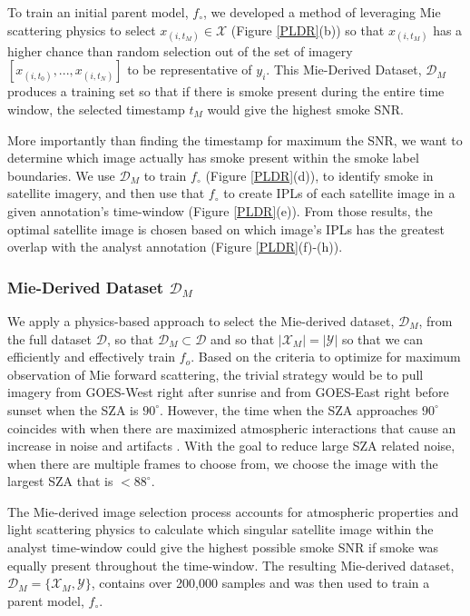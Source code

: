 \documentclass{article}
\begin{document}
To train an initial parent model, \(f_{\circ}\), we developed a method of leveraging Mie scattering physics to select \(x_{(i,t_M)} \in \mathcal{X}\) (Figure \ref{PLDR}(b)) so that \(x_{(i,t_M)}\) has a higher chance than random selection out of the set of imagery \([x_{(i,t_0)},...,x_{(i,t_N)}]\) to be representative of \(y_i\). This Mie-Derived Dataset, \(\mathcal{D}_M\) produces a training set so that if there is smoke present during the entire time window, the selected timestamp \(t_M\) would give the highest smoke SNR. 

More importantly than finding the timestamp for maximum the SNR, we want to determine which image actually has smoke present within the smoke label boundaries. We use \(\mathcal{D}_M\) to train \(f_{\circ}\) (Figure \ref{PLDR}(d)), to identify smoke in satellite imagery, and then use that \(f_{\circ}\) to create IPLs of each satellite image in a given annotation's time-window (Figure \ref{PLDR}(e)). From those results, the optimal satellite image is chosen based on which image's IPLs has the greatest overlap with the analyst annotation (Figure \ref{PLDR}(f)-(h)).


\subsubsection{Mie-Derived Dataset \(\mathcal{D}_M\)}

We apply a physics-based approach to select the Mie-derived dataset, \(\mathcal{D}_M\), from the full dataset \(\mathcal{D}\), so that \(\mathcal{D}_M \subset \mathcal{D}\) and so that \(|\mathcal{X}_M|=|\mathcal{Y}|\) so that we can efficiently and effectively train \(f_o\). Based on the criteria to optimize for maximum observation of Mie forward scattering, the trivial strategy would be to pull imagery from GOES-West right after sunrise and from GOES-East right before sunset when the SZA is \(90^{\circ}\). However, the time when the SZA approaches \(90^{\circ}\) coincides with when there are maximized atmospheric interactions that cause an increase in noise and artifacts \cite{zen_angle}. With the goal to reduce large SZA related noise, when there are multiple frames to choose from, we choose the image with the largest SZA that is \(<88^{\circ}\).

The Mie-derived image selection process accounts for atmospheric properties and light scattering physics to calculate which singular satellite image within the analyst time-window could give the highest possible smoke SNR if smoke was equally present throughout the time-window. The resulting Mie-derived dataset, \(\mathcal{D}_M = \{\mathcal{X}_M, \mathcal{Y}\}\), contains over 200,000 samples and was then used to train a parent model, \(f_{\circ}\). 
\end{document}
